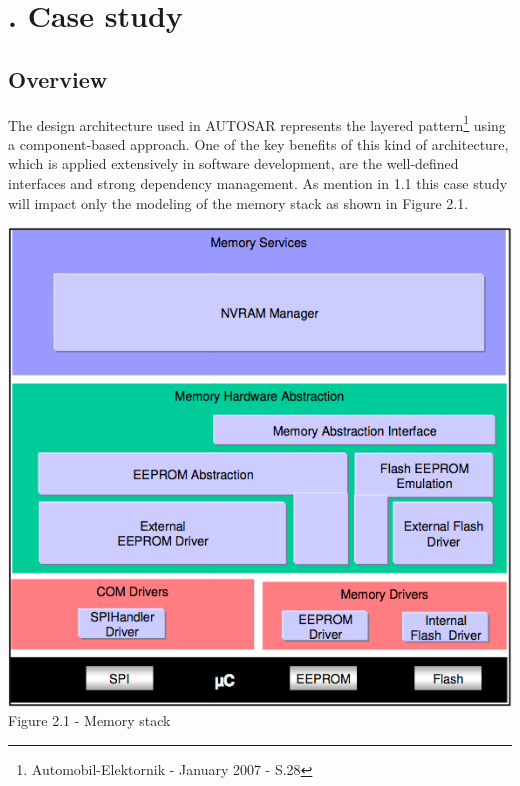 \newpage
\chapter[Case study]{\thechapter. Case study}
\section{Overview}
The design architecture used in AUTOSAR represents the layered pattern\footnote{Automobil-Elektornik - January 2007 - S.28} using a component-based approach. One of the key benefits of this kind of architecture, which is applied extensively in software development, are the well-defined interfaces and strong dependency management.\newline
As mention in 1.1 this case study will impact only the modeling of the memory stack as shown in Figure 2.1.
\begin{center}
\includegraphics[scale=0.55]{Images/Figure2_1.png}\\
Figure 2.1 - Memory stack
\end{center}
\newpage

\newpage

\newpage

\newpage

\newpage


